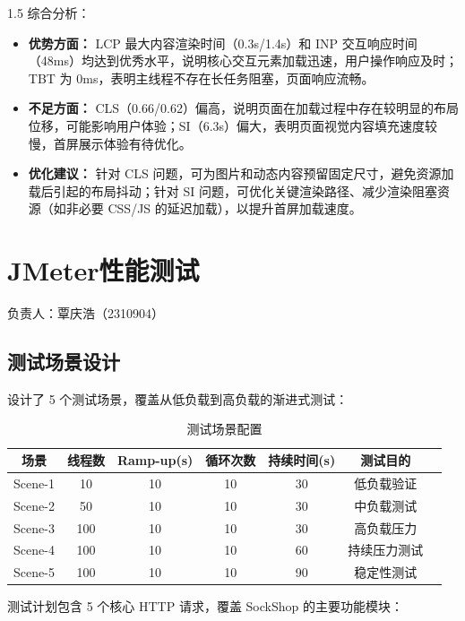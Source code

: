 \documentclass[a4paper,12pt]{report}
\begin{document}
\begin{spacing}{1.5}
综合分析：
\begin{itemize}
    \item \textbf{优势方面：} LCP 最大内容渲染时间（0.3s/1.4s）和 INP 交互响应时间（48ms）均达到优秀水平，说明核心交互元素加载迅速，用户操作响应及时；TBT 为 0ms，表明主线程不存在长任务阻塞，页面响应流畅。
    \item \textbf{不足方面：} CLS（0.66/0.62）偏高，说明页面在加载过程中存在较明显的布局位移，可能影响用户体验；SI（6.3s）偏大，表明页面视觉内容填充速度较慢，首屏展示体验有待优化。
    \item \textbf{优化建议：} 针对 CLS 问题，可为图片和动态内容预留固定尺寸，避免资源加载后引起的布局抖动；针对 SI 问题，可优化关键渲染路径、减少渲染阻塞资源（如非必要 CSS/JS 的延迟加载），以提升首屏加载速度。
\end{itemize}

\section{JMeter性能测试}
\vspace{-0.5em}
\begin{flushright}
{\kaishu{} 负责人：覃庆浩（2310904）}
\end{flushright}

\subsection{测试场景设计}
设计了 5 个测试场景，覆盖从低负载到高负载的渐进式测试：

\begin{table}[htbp]
\centering
\caption{测试场景配置}
\begin{tabular}{ccccccc}
\toprule
\textbf{场景} & \textbf{线程数} & \textbf{Ramp-up(s)} & \textbf{循环次数} & \textbf{持续时间(s)} & \textbf{测试目的} \\
\midrule
Scene-1 & 10 & 10 & 10 & 30 & 低负载验证 \\
Scene-2 & 50 & 10 & 10 & 30 & 中负载测试 \\
Scene-3 & 100 & 10 & 10 & 30 & 高负载压力 \\
Scene-4 & 100 & 10 & 10 & 60 & 持续压力测试 \\
Scene-5 & 100 & 10 & 10 & 90 & 稳定性测试 \\
\bottomrule
\end{tabular}
\end{table}

测试计划包含 5 个核心 HTTP 请求，覆盖 SockShop 的主要功能模块：


\end{spacing}
\end{document}
